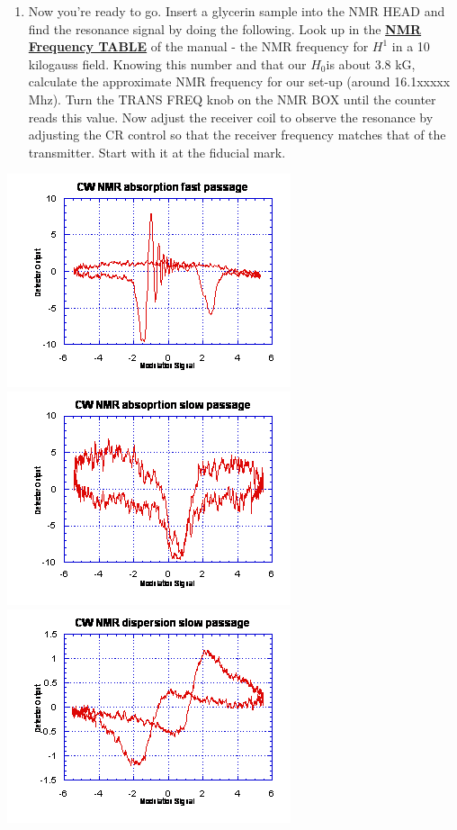 \documentclass{../lab}
\begin{document}
\begin{enumerate}
    \item Now you're ready to go. Insert a glycerin sample into the NMR HEAD and find the resonance signal by doing the following. Look up in the \href{http://dev-physicsadv.pantheon.berkeley.edu/sites/default/files/images/NMR32.jpg}{\textbf{NMR Frequency TABLE}} of the manual - the NMR frequency for $ H^1$  in a 10 kilogauss field. Knowing this number and that our $H_0$is about 3.8 kG, calculate the approximate NMR frequency for our set-up (around 16.1xxxxx Mhz). Turn the TRANS FREQ knob on the NMR BOX until the counter reads this value. Now adjust the receiver coil to observe the resonance by adjusting the CR control so that the receiver frequency matches that of the transmitter. Start with it at the fiducial mark.

\end{enumerate}

\noindent
\href{http://experimentationlab.berkeley.edu/sites/default/files/images/NMR21.gif}{\includegraphics[width=0.33\linewidth,keepaspectratio]{images/NMR21.png}}
\href{http://experimentationlab.berkeley.edu/sites/default/files/images/NMR22.gif}{\includegraphics[width=0.33\linewidth,keepaspectratio]{images/NMR22.png}}
\href{http://experimentationlab.berkeley.edu/sites/default/files/images/NMR23.gif}{\includegraphics[width=0.33\linewidth,keepaspectratio]{images/NMR23.png}}
\end{document}
